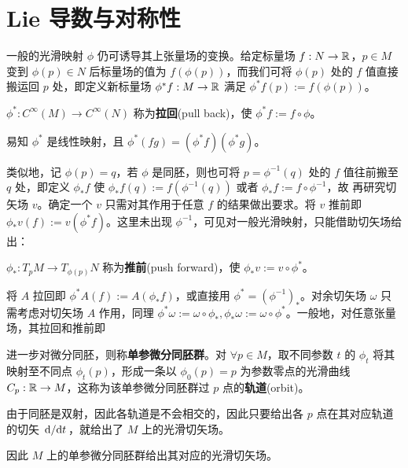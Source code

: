 \chapter{Lie 导数与对称性}\label{appx:Lie-deri}

一般的光滑映射 $\phi$ 仍可诱导其上张量场的变换。给定标量场 $f:N\to\mathbb{R}$，$p\in M$ 变到 $\phi(p)\in N$ 后标量场的值为 $f(\phi(p))$，而我们可将 $\phi(p)$ 处的 $f$ 值直接搬运回 $p$ 处，即定义新标量场 $\phi^* f:M\to\mathbb{R}$ 满足 $\phi^* f(p):=f(\phi(p))$。
\begin{definition}
    $\phi^*:C^\infty(M)\to C^\infty(N)$ 称为\textbf{拉回}(pull back)，使 $\phi^* f:=f\circ\phi$。
\end{definition}

\begin{theorem}
    易知 $\phi^*$ 是线性映射，且 $\phi^*(fg)=(\phi^* f) (\phi^* g)$。
\end{theorem}



类似地，记 $\phi(p)=q$，若 $\phi$ 是同胚，则也可将 $p=\phi^{-1}(q)$ 处的 $f$ 值往前搬至 $q$ 处，即定义 $\phi_* f$ 使 $\phi_* f(q):=f(\phi^{-1}(q))$ 或者 $\phi_* f:=f\circ\phi^{-1}$，故
再研究切矢场 $v$。确定一个 $v$ 只需对其作用于任意 $f$ 的结果做出要求。将 $v$ 推前即 $\phi_* v(f):=v(\phi^* f)$。这里未出现 $\phi^{-1}$，可见对一般光滑映射，只能借助切矢场给出：
\begin{definition}
    $\phi_*:T_p M\to T_{\phi(p)}N$ 称为\textbf{推前}(push forward)，使 $\phi_* v:=v\circ \phi^*$。
\end{definition}

将 $A$ 拉回即 $\phi^* A(f):=A(\phi_* f)$，或直接用 $\phi^*=(\phi^{-1})_*$。对余切矢场 $\omega$ 只需考虑对切矢场 $A$ 作用，同理 $\phi^* \omega:=\omega\circ\phi_*,\phi_* \omega:=\omega\circ\phi^*$。一般地，对任意张量场，其拉回和推前即



进一步对微分同胚，则称\textbf{单参微分同胚群}。对 $\forall p\in M$，取不同参数 $t$ 的 $\phi_t$ 将其映射至不同点 $\phi_t(p)$，形成一条以 $\phi_0(p)=p$ 为参数零点的光滑曲线 $C_p:\mathbb{R}\to M$，这称为该单参微分同胚群过 $p$ 点的\textbf{轨道}(orbit)。

由于同胚是双射，因此各轨道是不会相交的，因此只要给出各 $p$ 点在其对应轨道的切矢 $\dv*{t}$，就给出了 $M$ 上的光滑切矢场。

因此 $M$ 上的单参微分同胚群给出其对应的光滑切矢场。

